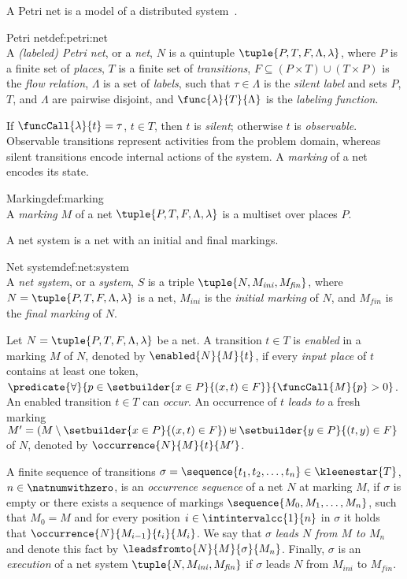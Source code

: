 A Petri net is a model of a distributed system~\cite{Reisig98}.

\begin{define}{Petri net}{def:petri:net}{\quad\\}
A \emph{(labeled) Petri net}, or a \emph{net}, $N$ is a quintuple $\tuple{P,T,F,\Lambda,\lambda}$, where
$P$ is a finite set of \emph{places},
$T$ is a finite set of \emph{transitions},
$F \subseteq (P \times T) \cup (T \times P)$ is the \emph{flow relation},
$\Lambda$ is a set of \emph{labels}, such that $\tau \in \Lambda$ is the \emph{silent label} and sets $P$, $T$, and $\Lambda$ are pairwise disjoint, and 
$\func{\lambda}{T}{\Lambda}$ is the \emph{labeling function}.
\end{define}

\noindent
If $\funcCall{\lambda}{t}=\tau$, $t \in T$, then $t$ is \emph{silent}; otherwise $t$ is \emph{observable}.
Observable transitions represent activities from the problem domain, whereas silent transitions encode internal actions of the system. 
A \emph{marking} of a net encodes its state.

\begin{define}{Marking}{def:marking}{\quad\\}
A \emph{marking} $M$ of a net $\tuple{P,T,F,\Lambda,\lambda}$ is a multiset over places $P$.
\end{define}

\noindent
A net system is a net with an initial and final markings.

\begin{define}{Net system}{def:net:system}{\quad\\}
A \emph{net system}, or a \emph{system}, $S$ is a triple $\tuple{N,M_{\mathit{ini}},M_{\mathit{fin}}}$, where 
$N=\tuple{P,T,F,\Lambda,\lambda}$ is a net,
$M_{\mathit{ini}}$ is the \emph{initial marking} of $N$, and 
$M_{\mathit{fin}}$ is the \emph{final marking} of $N$.
\end{define}

\noindent
Let $N=\tuple{P,T,F,\Lambda,\lambda}$ be a net.
A transition $t \in T$ is \emph{enabled} in a marking $M$ of $N$, denoted by $\enabled{N}{M}{t}$, if every \emph{input place} of $t$ contains at least one token, \ie 
$\predicate{\forall}{p \in \setbuilder{x \in P}{(x,t) \in F}}{\funcCall{M}{p} > 0}$. 
An enabled transition $t \in T$ can \emph{occur}.
An occurrence of $t$ \emph{leads to} a fresh marking $M' = (M \setminus \setbuilder{x \in P}{(x,t) \in F}) \uplus \setbuilder{y \in P}{(t,y) \in F}$ of $N$, denoted by $\occurrence{N}{M}{t}{M'}$.

A finite sequence of transitions $\sigma=\sequence{t_1,t_2,\ldots,t_n} \in \kleenestar{T}$, $n \in \natnumwithzero$, is an \emph{occurrence sequence} of a net $N$ at marking $M$, if $\sigma$ is empty or there exists a sequence of markings $\sequence{M_0,M_1,\ldots,M_n}$, such that $M_0=M$ and for every position $i \in \intintervalcc{1}{n}$ in $\sigma$ it holds that $\occurrence{N}{M_{i-1}}{t_i}{M_i}$.
We say that $\sigma$ \emph{leads $N$ from $M$ to $M_n$} and denote this fact by $\leadsfromto{N}{M}{\sigma}{M_n}$.
Finally, $\sigma$ is an \emph{execution} of a net system $\tuple{N,M_\mathit{ini},M_\mathit{fin}}$ if $\sigma$ leads $N$ from $M_\mathit{ini}$ to $M_\mathit{fin}$.